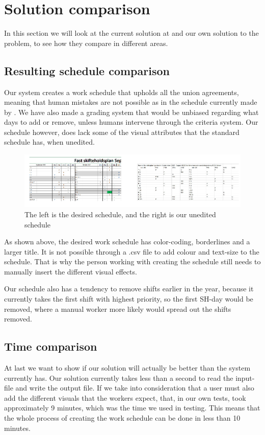 \section{Solution comparison}
In this section we will look at the current solution at \siemens and our own solution to the problem, to see how they compare in different areas.

\subsection{Resulting schedule comparison}

Our system creates a work schedule that upholds all the union agreements, meaning that human mistakes are not possible as in the schedule currently made by \siemens. We have also made a grading system that would be unbiased regarding what days to add or remove, unless humans intervene through the criteria system. Our schedule however, does lack some of the visual attributes that the standard schedule has, when unedited. 

\begin{figure}[ht!]
    \centering
    \includegraphics[width=\textwidth]{media/Comparison of Schedules.png}
    \caption{The left is the desired schedule, and the right is our unedited schedule}
    \label{fig:Our_Table}
\end{figure}

As shown above, the desired work schedule has color-coding, borderlines and a larger title. It is not possible through a .csv file to add colour and text-size to the schedule. That is why the person working with creating the schedule still needs to manually insert the different visual effects.

Our schedule also has a tendency to remove shifts earlier in the year, because it currently takes the first shift with highest priority, so the first SH-day would be removed, where a manual worker more likely would spread out the shifts removed. 

\subsection{Time comparison}
At last we want to show if our solution will actually be better than the system \siemens currently has. Our solution currently takes less than a second to read the input-file and write the output file. If we take into consideration that a user must also add the different visuals that the workers expect, that, in our own tests, took approximately 9 minutes, which was the time we used in testing. This means that the whole process of creating the work schedule can be done in less than 10 minutes.


